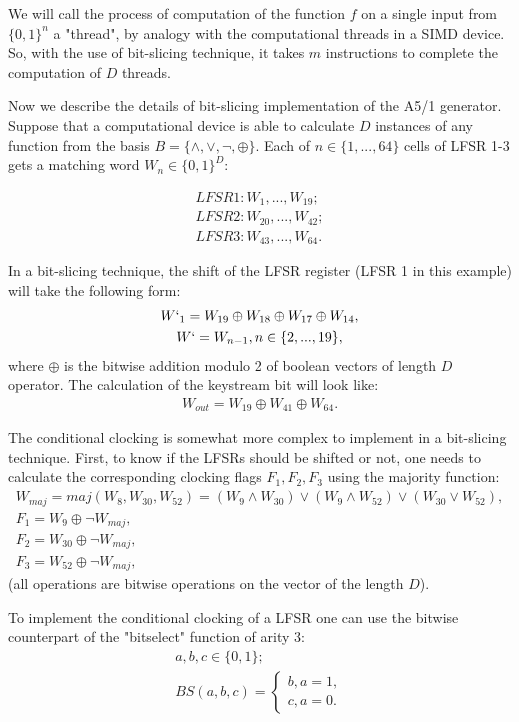 \documentclass[runningheads,a4paper]{llncs}[2015/06/24]
\begin{document}
We will call the process of computation of the function $f$ on a single input
from $\{0,1\}^n$ a "thread", by analogy with the computational threads in a
SIMD device. So, with the use of bit-slicing technique, it takes $m$
instructions to complete the computation of $D$ threads.

Now we describe the details of bit-slicing implementation of the A5/1
generator. Suppose that a computational device is able to calculate $D$
instances of any function from the basis $B=\{\land,\lor,\neg,\oplus\}$. Each
of $n\in\{1,...,64\}$ cells of LFSR 1-3 gets a matching word $W_n\in\{0,1\}^D$:

\begin{gather*} 
	LFSR1:W_1,...,W_{19}; 
	\\LFSR2:W_{20},...,W_{42}; 
	\\LFSR3:W_{43},...,W_{64}.
\end{gather*}

In a bit-slicing technique, the shift of the LFSR register (LFSR 1 in this
example) will take the following form: 
\begin{gather*} 
	W`_1=W_{19} \oplus W_{18} \oplus W_{17} \oplus W_{14}, 
	\\W`=W_{n-1}, n \in \{2,...,19\},
\end{gather*}
where $\oplus$ is the bitwise addition modulo 2 of boolean vectors of length
$D$ operator. The calculation of the keystream bit will look like:
\begin{gather*} 
	W_{out}=W_{19} \oplus W_{41} \oplus W_{64}.
\end{gather*}

The conditional clocking is somewhat more complex to implement in a bit-slicing
technique. First, to know if the LFSRs should be shifted or not, one needs to
calculate the corresponding clocking flags $F_1,F_2,F_3$ using the majority
function: 
\begin{gather*} 
	W_{maj}=maj(W_8,W_{30},W_{52})=(W_9 \wedge W_{30}) \vee (W_9 \wedge W_{52})
	\vee (W_{30} \vee W_{52}), \\F_1 = W_9 \oplus {\neg W_{maj}}, \\F_2 =
	W_{30} \oplus {\neg W_{maj}}, \\F_3 = W_{52} \oplus {\neg W_{maj}},
\end{gather*} 
(all operations are bitwise operations on the vector of the length $D$).

To implement the conditional clocking of a LFSR one can use the bitwise
counterpart of the "bitselect" function of arity 3: 
\begin{gather*} a,b,c \in \{0,1\}; \\ BS(a,b,c) = \left\lbrace
	\begin{array}{ll} b,a=1, \\ c,a=0.
	\end{array} \right.
\end{gather*} 
\end{document}
